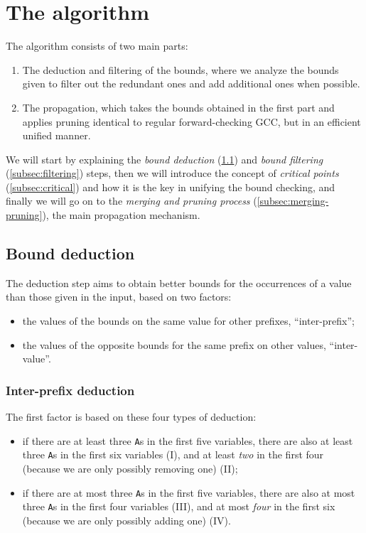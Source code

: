 \documentclass[a4paper,10pt]{article}
\begin{document}
\section{The algorithm}
The algorithm consists of two main parts:
\begin{enumerate}
    \item The deduction and filtering of the bounds, where we analyze the bounds given to filter out the redundant ones and add additional ones when possible.
    \item The propagation, which takes the bounds obtained in the first part and applies pruning identical to regular forward-checking GCC, but in an efficient unified manner.
\end{enumerate}

We will start by explaining the \emph{bound deduction} (\ref{subsec:deduction}) and \emph{bound filtering} (\ref{subsec:filtering}) steps, then we will introduce the concept of \emph{critical points} (\ref{subsec:critical}) and how it is the key in unifying the bound checking, and finally we will go on to the \emph{merging and pruning process} (\ref{subsec:merging-pruning}), the main propagation mechanism.

\subsection{Bound deduction}
\label{subsec:deduction}

The deduction step aims to obtain better bounds for the occurrences of a value than those given in the input, based on two factors:
\begin{itemize}
    \item the values of the bounds on the same value for other prefixes, ``inter-prefix'';
    \item the values of the opposite bounds for the same prefix on other values, ``inter-value''.
\end{itemize}

\subsubsection{Inter-prefix deduction}

The first factor is based on these four types of deduction:
\begin{itemize}
    \item if there are at least three \texttt{A}s in the first five variables, there are also at least three \texttt{A}s in the first six variables (I), and at least \emph{two} in the first four (because we are only possibly removing one) (II);
    \item if there are at most three \texttt{A}s in the first five variables, there are also at most three \texttt{A}s in the first four variables (III), and at most \emph{four} in the first six (because we are only possibly adding one) (IV).
\end{itemize}
\end{document}
